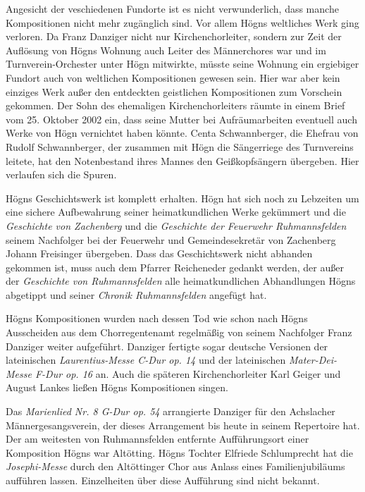 \documentclass{book}
\begin{document}
Angesicht der veschiedenen Fundorte ist es nicht verwunderlich, dass
manche Kompositionen nicht mehr zugänglich sind. Vor allem Högns
weltliches Werk ging verloren. Da Franz Danziger nicht nur
Kirchenchorleiter, sondern zur Zeit der Auflösung von Högns Wohnung
auch Leiter des Männerchores war und im Turnverein-Orchester unter Högn
mitwirkte, müsste seine Wohnung ein ergiebiger Fundort auch von
weltlichen Kompositionen gewesen sein. Hier war aber kein einziges Werk
außer den entdeckten geistlichen Kompositionen zum Vorschein
gekommen. Der Sohn des ehemaligen Kirchenchorleiters räumte in einem
Brief vom 25. Oktober 2002 ein, dass seine Mutter bei Aufräumarbeiten
eventuell auch Werke von Högn vernichtet haben könnte. Centa
Schwannberger, die Ehefrau von Rudolf Schwannberger, der zusammen mit
Högn die Sängerriege des Turnvereins leitete, hat den Notenbestand
ihres Mannes den Geißkopfsängern übergeben. Hier verlaufen sich die
Spuren.

Högns Geschichtswerk ist komplett erhalten. Högn hat sich noch zu
Lebzeiten um eine sichere Aufbewahrung seiner heimatkundlichen Werke
gekümmert und die \textit{Geschichte von Zachenberg} und die
\textit{Geschichte der Feuerwehr Ruhmannsfelden} seinem Nachfolger
bei der Feuerwehr und Gemeindesekretär von Zachenberg Johann Freisinger
übergeben. Dass das Geschichtswerk nicht abhanden gekommen ist, muss
auch dem Pfarrer Reicheneder gedankt werden, der außer der
\textit{Geschichte von Ruhmannsfelden} alle heimatkundlichen
Abhandlungen Högns abgetippt und seiner \textit{Chronik
Ruhmannsfelden} angefügt hat.

Högns Kompositionen wurden nach dessen Tod wie schon nach Högns
Ausscheiden aus dem Chorregentenamt regelmäßig von seinem Nachfolger
Franz Danziger weiter aufgeführt. Danziger fertigte sogar deutsche
Versionen der lateinischen \textit{Laurentius-Messe C-Dur op. 14} und
der lateinischen \textit{Mater-Dei-Messe F-Dur op. 16} an. Auch die
späteren Kirchenchorleiter Karl Geiger und August Lankes ließen Högns
Kompositionen singen.

Das \textit{Marienlied Nr. 8 G-Dur op. 54} arrangierte Danziger für den
Achslacher Männergesangsverein, der dieses Arrangement bis heute in
seinem Repertoire hat. Der am weitesten von Ruhmannsfelden entfernte
Aufführungsort einer Komposition Högns war Altötting. Högns Tochter
Elfriede Schlumprecht hat die \textit{Josephi-Messe} durch den
Altöttinger Chor aus Anlass eines Familienjubiläums aufführen lassen.
Einzelheiten über diese Aufführung sind nicht bekannt.
\end{document}
